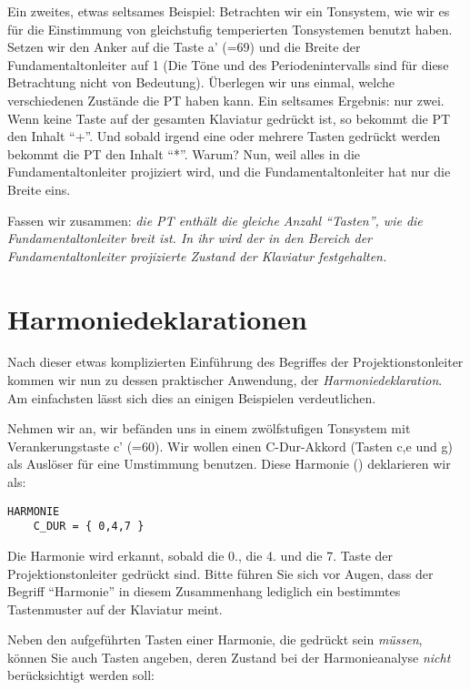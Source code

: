 \begin{center}

\end{center}

Ein zweites, etwas seltsames Beispiel: Betrachten wir ein Tonsystem,
wie wir es für die Einstimmung von gleichstufig temperierten
Tonsystemen benutzt haben. Setzen wir den Anker auf die Taste a' (=69)
und die Breite der Fundamentaltonleiter auf 1 (Die Töne und des Periodenintervalls sind
für diese Betrachtung nicht von Bedeutung).  Überlegen wir uns einmal,
welche verschiedenen Zustände die PT haben kann. Ein seltsames
Ergebnis: nur zwei. Wenn keine Taste auf der gesamten Klaviatur
gedrückt ist, so bekommt die PT den Inhalt "`+"'. Und sobald irgend
eine oder mehrere Tasten gedrückt werden bekommt die PT den Inhalt
"`*"'. Warum? Nun, weil alles in die Fundamentaltonleiter projiziert wird, und die Fundamentaltonleiter
hat nur die Breite eins.

Fassen wir zusammen: \emph{die PT enthält die gleiche Anzahl
"`Tasten"', wie die Fundamentaltonleiter breit ist. In ihr wird der in den Bereich
der Fundamentaltonleiter projizierte Zustand der Klaviatur festgehalten.}

\section{Harmoniedeklarationen}\label{sec:harm}
Nach dieser etwas komplizierten Einführung des Begriffes der
Projektionstonleiter kommen wir nun zu dessen praktischer Anwendung,
der \emph{Harmoniedeklaration}. Am einfachsten lässt sich dies an
einigen Beispielen verdeutlichen.

Nehmen wir an, wir befänden uns in einem zwölfstufigen Tonsystem
mit Verankerungstaste c' (=60). Wir wollen einen C-Dur-Akkord
(Tasten c,e und g) als Auslöser für eine Umstimmung benutzen.
Diese Harmonie () deklarieren wir als:
\begin{verbatim}
HARMONIE
    C_DUR = { 0,4,7 }
\end{verbatim}
Die Harmonie  wird erkannt, sobald die 0., die 4. und die 7.
Taste der Projektionstonleiter gedrückt sind. Bitte führen Sie sich
vor Augen, dass der Begriff "`Harmonie"'
in diesem Zusammenhang lediglich ein bestimmtes Tastenmuster
auf der Klaviatur meint.

Neben den aufgeführten Tasten einer Harmonie, die gedrückt sein {\em
  müssen}, können Sie auch Tasten angeben, deren Zustand bei der
Harmonieanalyse \emph{nicht} berücksichtigt werden soll:

